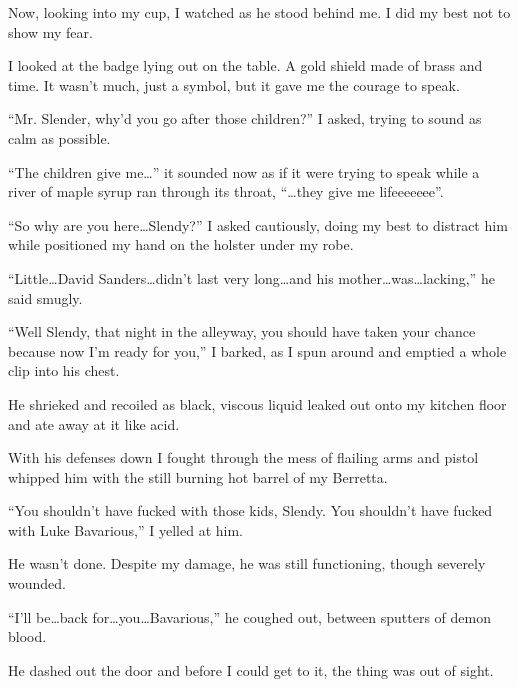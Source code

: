 Now, looking into my cup, I watched as he stood behind me. I did my
best not to show my fear.



I looked at the badge lying out on the table. A gold shield made of
brass and time. It wasn't much, just a symbol, but it gave me
the courage to speak.



``Mr. Slender, why'd you go after those children?''
I asked, trying to sound as calm as possible.



``The children give me{\ldots}'' it sounded now as if it
were trying to speak while a river of maple syrup ran through its
throat, ``{\ldots}they give me lifeeeeeee''.



``So why are you here{\ldots}Slendy?'' I asked
cautiously, doing my best to distract him while positioned my hand
on the holster under my robe.



``Little{\ldots}David Sanders{\ldots}didn't last very
long{\ldots}and his mother{\ldots}was{\ldots}lacking,'' he
said smugly.



``Well Slendy, that night in the alleyway, you should have
taken your chance because now I'm ready for you,'' I
barked, as I spun around and emptied a whole clip into his
chest.



He shrieked and recoiled as black, viscous liquid leaked out onto
my kitchen floor and ate away at it like acid.



With his defenses down I fought through the mess of flailing arms
and pistol whipped him with the still burning hot barrel of my
Berretta.



``You shouldn't have fucked with those kids, Slendy. You
shouldn't have fucked with Luke Bavarious,'' I yelled at
him.



He wasn't done. Despite my damage, he was still functioning,
though severely wounded.



``I'll be{\ldots}back
for{\ldots}you{\ldots}Bavarious,'' he coughed out, between
sputters of demon blood.



He dashed out the door and before I could get to it, the thing was
out of sight.



